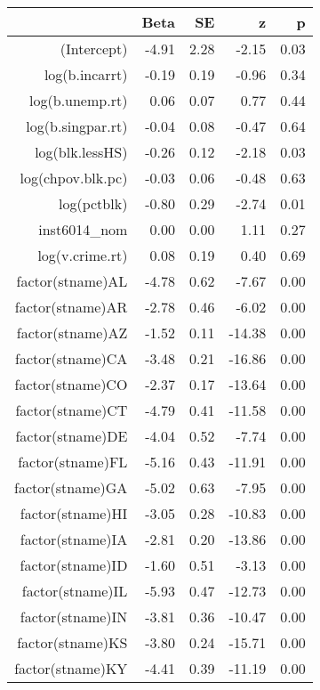\begin{table}[ht]
\centering
\begin{tabular}{rrrrr}
  \hline
 & Beta & SE & z & p \\ 
  \hline
(Intercept) & -4.91 & 2.28 & -2.15 & 0.03 \\ 
  log(b.incarrt) & -0.19 & 0.19 & -0.96 & 0.34 \\ 
  log(b.unemp.rt) & 0.06 & 0.07 & 0.77 & 0.44 \\ 
  log(b.singpar.rt) & -0.04 & 0.08 & -0.47 & 0.64 \\ 
  log(blk.lessHS) & -0.26 & 0.12 & -2.18 & 0.03 \\ 
  log(chpov.blk.pc) & -0.03 & 0.06 & -0.48 & 0.63 \\ 
  log(pctblk) & -0.80 & 0.29 & -2.74 & 0.01 \\ 
  inst6014\_nom & 0.00 & 0.00 & 1.11 & 0.27 \\ 
  log(v.crime.rt) & 0.08 & 0.19 & 0.40 & 0.69 \\ 
  factor(stname)AL & -4.78 & 0.62 & -7.67 & 0.00 \\ 
  factor(stname)AR & -2.78 & 0.46 & -6.02 & 0.00 \\ 
  factor(stname)AZ & -1.52 & 0.11 & -14.38 & 0.00 \\ 
  factor(stname)CA & -3.48 & 0.21 & -16.86 & 0.00 \\ 
  factor(stname)CO & -2.37 & 0.17 & -13.64 & 0.00 \\ 
  factor(stname)CT & -4.79 & 0.41 & -11.58 & 0.00 \\ 
  factor(stname)DE & -4.04 & 0.52 & -7.74 & 0.00 \\ 
  factor(stname)FL & -5.16 & 0.43 & -11.91 & 0.00 \\ 
  factor(stname)GA & -5.02 & 0.63 & -7.95 & 0.00 \\ 
  factor(stname)HI & -3.05 & 0.28 & -10.83 & 0.00 \\ 
  factor(stname)IA & -2.81 & 0.20 & -13.86 & 0.00 \\ 
  factor(stname)ID & -1.60 & 0.51 & -3.13 & 0.00 \\ 
  factor(stname)IL & -5.93 & 0.47 & -12.73 & 0.00 \\ 
  factor(stname)IN & -3.81 & 0.36 & -10.47 & 0.00 \\ 
  factor(stname)KS & -3.80 & 0.24 & -15.71 & 0.00 \\ 
  factor(stname)KY & -4.41 & 0.39 & -11.19 & 0.00 \\ 

\end{tabular}
\end{table}
